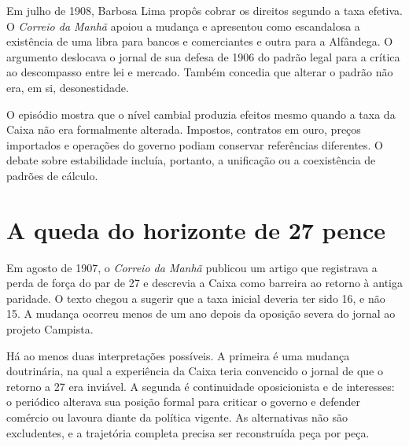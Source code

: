 Em julho de 1908, Barbosa Lima propôs cobrar os direitos segundo a taxa efetiva. O \textit{Correio da Manhã} apoiou a mudança e apresentou como escandalosa a existência de uma libra para bancos e comerciantes e outra para a Alfândega. O argumento deslocava o jornal de sua defesa de 1906 do padrão legal para a crítica ao descompasso entre lei e mercado. Também concedia que alterar o padrão não era, em si, desonestidade.


O episódio mostra que o nível cambial produzia efeitos mesmo quando a taxa da Caixa não era formalmente alterada. Impostos, contratos em ouro, preços importados e operações do governo podiam conservar referências diferentes. O debate sobre estabilidade incluía, portanto, a unificação ou a coexistência de padrões de cálculo.

\section{A queda do horizonte de 27 pence}

Em agosto de 1907, o \textit{Correio da Manhã} publicou um artigo que registrava a perda de força do par de 27 e descrevia a Caixa como barreira ao retorno à antiga paridade. O texto chegou a sugerir que a taxa inicial deveria ter sido 16, e não 15. A mudança ocorreu menos de um ano depois da oposição severa do jornal ao projeto Campista.


Há ao menos duas interpretações possíveis. A primeira é uma mudança doutrinária, na qual a experiência da Caixa teria convencido o jornal de que o retorno a 27 era inviável. A segunda é continuidade oposicionista e de interesses: o periódico alterava sua posição formal para criticar o governo e defender comércio ou lavoura diante da política vigente. As alternativas não são excludentes, e a trajetória completa precisa ser reconstruída peça por peça.


